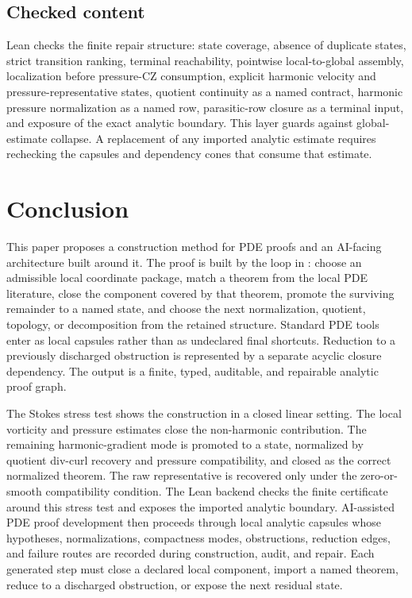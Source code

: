 \documentclass[11pt]{article}
\theoremstyle{plain}
\theoremstyle{definition}
\theoremstyle{remark}
\begin{document}
\subsection{Checked content}
Lean checks the finite repair structure: state coverage, absence of duplicate
states, strict transition ranking, terminal reachability, pointwise
local-to-global assembly, localization before pressure-CZ consumption, explicit
harmonic velocity and pressure-representative states, quotient continuity as a named
contract, harmonic pressure normalization as a named row, parasitic-row closure as
a terminal input, and exposure of the exact analytic boundary.  This layer
guards against global-estimate collapse.  A replacement of any imported
analytic estimate requires rechecking the capsules and dependency cones that
consume that estimate.

\section{Conclusion}
\label{sec:conclusion}

This paper proposes a construction method for PDE proofs and an AI-facing
architecture built around it.  The proof is built by the loop in
: choose an admissible local
coordinate package, match a theorem from the local PDE literature, close the
component covered by that theorem, promote the surviving remainder to a named
state, and choose the next normalization, quotient, topology, or decomposition
from the retained structure.  Standard PDE tools enter as local capsules rather
than as undeclared final shortcuts.  Reduction to a previously discharged
obstruction is represented by a separate acyclic closure dependency.  The
output is a finite, typed, auditable, and repairable analytic proof graph.

The Stokes stress test shows the construction in a closed linear setting.  The
local vorticity and pressure estimates close the non-harmonic contribution.
The remaining harmonic-gradient mode is promoted to a state, normalized by
quotient div-curl recovery and pressure compatibility, and closed as the
correct normalized theorem.  The raw representative is recovered only under the
zero-or-smooth compatibility condition.  The Lean backend checks the finite
certificate around this stress test and exposes the imported analytic boundary.
AI-assisted PDE proof development then proceeds through local analytic capsules
whose hypotheses, normalizations, compactness modes, obstructions, reduction
edges, and failure routes are recorded during construction, audit, and repair.
Each generated step must close a declared local component, import a named
theorem, reduce to a discharged obstruction, or expose the next residual state.
\end{document}
